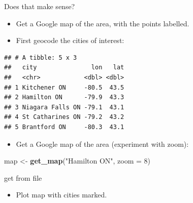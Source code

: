 \documentclass[ignorenonframetext,]{beamer}
\newenvironment{Shaded}{\begin{snugshade}}{\end{snugshade}}
\newcommand{\DataTypeTok}[1]{\textcolor[rgb]{0.13,0.29,0.53}{#1}}
\newcommand{\DecValTok}[1]{\textcolor[rgb]{0.00,0.00,0.81}{#1}}
\newcommand{\KeywordTok}[1]{\textcolor[rgb]{0.13,0.29,0.53}{\textbf{#1}}}
\newcommand{\NormalTok}[1]{#1}
\newcommand{\OperatorTok}[1]{\textcolor[rgb]{0.81,0.36,0.00}{\textbf{#1}}}
\newcommand{\StringTok}[1]{\textcolor[rgb]{0.31,0.60,0.02}{#1}}
\providecommand{\tightlist}{%
  \setlength{\itemsep}{0pt}\setlength{\parskip}{0pt}}
\begin{document}
\begin{frame}[fragile]{Does that make sense?}
\protect\hypertarget{does-that-make-sense}{}

\begin{itemize}
\item
  Get a Google map of the area, with the points labelled.
\item
  First geocode the cities of interest:
\end{itemize}

\begin{Shaded}
\end{Shaded}

\begin{verbatim}
## # A tibble: 5 x 3
##   city               lon   lat
##   <chr>            <dbl> <dbl>
## 1 Kitchener ON     -80.5  43.5
## 2 Hamilton ON      -79.9  43.3
## 3 Niagara Falls ON -79.1  43.1
## 4 St Catharines ON -79.2  43.2
## 5 Brantford ON     -80.3  43.1
\end{verbatim}

\begin{itemize}
\tightlist
\item
  Get a Google map of the area (experiment with zoom):
\end{itemize}

\begin{Shaded}
\begin{Highlighting}[]
\NormalTok{map <-}\StringTok{ }\KeywordTok{get_map}\NormalTok{(}\StringTok{"Hamilton ON"}\NormalTok{, }\DataTypeTok{zoom =} \DecValTok{8}\NormalTok{)}
\end{Highlighting}
\end{Shaded}

get from file

\begin{itemize}
\tightlist
\item
  Plot map with cities marked.
\end{itemize}

\end{frame}
\end{document}
